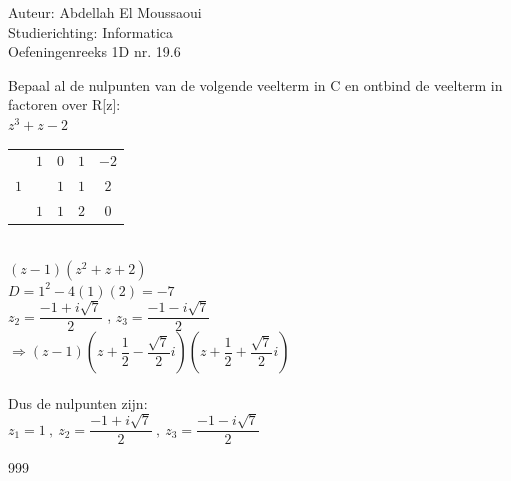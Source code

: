 \documentclass[a4paper]{article}
\begin{document}
  
\noindent \large Auteur: Abdellah El Moussaoui \\
\noindent \large Studierichting: Informatica\\
\noindent \large Oefeningenreeks 1D nr. 19.6\\

\medskip

\normalsize

Bepaal al de nulpunten van de volgende veelterm in C en ontbind de veelterm in factoren over R[z]: \\

$z^3 + z - 2$\\

\begin{tabular}{c|cccc}
& $1$ & $0$ & $1$ & $-2$\\
$1$ & & $1$ & $1$ & $2$\\ \hline
& $1$ & $1$ & $2$ & $0$
\end{tabular}\\

$(z - 1)(z^2 + z + 2)$\\

$D = 1^2 - 4(1)(2) = -7 $\\

$z_2 = \dfrac{-1+i\sqrt{7}}{2}$ , $z_3 = \dfrac{-1-i\sqrt{7}}{2}$\\

$\Rightarrow \left(z-1\right)\left(z+\dfrac{1}{2}-\dfrac{\sqrt{7}}{2}i\right)\left(z+\dfrac{1}{2}+\dfrac{\sqrt{7}}{2}i\right)$\\\\

Dus de nulpunten zijn:\\

$\boxed{z_1 = 1\ ,\ z_2 = \dfrac{-1+i\sqrt{7}}{2}\ ,\ z_3 = \dfrac{-1-i\sqrt{7}}{2}}$\\


\begin{thebibliography}{999}
\end{thebibliography}
\end{document}
